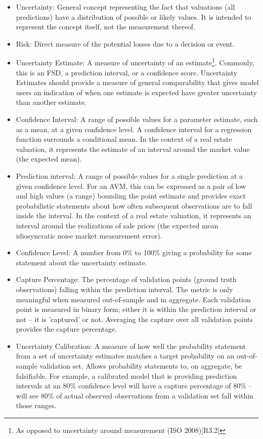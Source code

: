 \documentclass[colTwo]{anon}
\theoremstyle{definition}
\begin{document}
\begin{itemize}
\item Uncertainty: General concept representing the fact that valuations (all predictions) have a distribution of possible or likely values.  It is intended to represent the concept itself, not the measurement thereof. 
\item Risk: Direct measure of the potential losses due to a decision or event.
\item Uncertainty Estimate: A measure of uncertainty of an estimate\footnote{As opposed to uncertainty around measurement (ISO 2008)[R3.2]}. Commonly, this is an FSD, a prediction interval, or a confidence score. Uncertainty Estimates should provide a measure of general comparability that gives model users an indication of when one estimate is expected have greater uncertainty than another estimate.
\item Confidence Interval: A range of possible values for a parameter estimate, such as a mean, at a given confidence level. A confidence interval for a regression function surrounds a conditional mean. In the context of a real estate valuation, it represents the estimate of an interval around the market value (the expected mean).
\item Prediction interval: A range of possible values for a single prediction at a given confidence level. For an AVM, this can be expressed as a pair of low and high values (a range) bounding the point estimate and provides exact probabilistic statements about how often subsequent observations are to fall inside the interval. In the context of a real estate valuation, it represents an interval around the realizations of sale prices (the expected mean \plus idiosyncratic noise \plus market measurement error). 
\item Confidence Level: A number from 0\% to 100\% giving a probability for some statement about the uncertainty estimate.
\item Capture Percentage: The percentage of validation points (ground truth observations) falling within the prediction interval. The metric is only meaningful when measured out-of-sample and in aggregate. Each validation point is measured in binary form; either it is within the prediction interval or not -- it is 'captured' or not. Averaging the capture over all validation points provides the capture percentage.
\item Uncertainty Calibration: A measure of how well the probability statement from a set of uncertainty estimates matches a target probability on an out-of-sample validation set. Allows probability statements to, on aggregate, be falsifiable. For example, a calibrated model that is providing prediction intervals at an 80\% confidence level will have a capture percentage of 80\% -- will see 80\% of actual observed observations from a validation set fall within those ranges.

\end{itemize}
\end{document}

